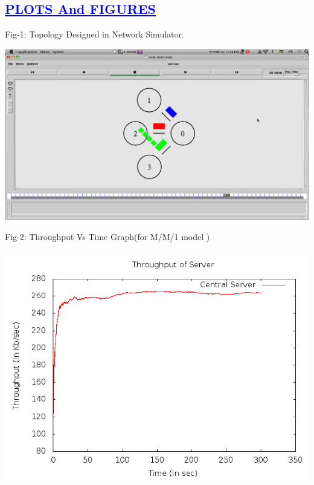 \documentclass[a4paper,12pt]{report}
\begin{document}
\begin{center}
\chapter{\textcolor{blue}{\underline {PLOTS And FIGURES}}}
\end{center}
\noindent Fig-1: Topology Designed in Network Simulator.\\
\begin{center}
 \includegraphics[width=13 cm,height=13 cm]{./Screenshot.png}
\end{center}


\noindent Fig-2: Throughput Vs Time Graph(for M/M/1 model )\\
\begin{center}
 \includegraphics[width=12 cm,height=12 cm]{../problem/throughput.png}
\end{center}
\end{document}
